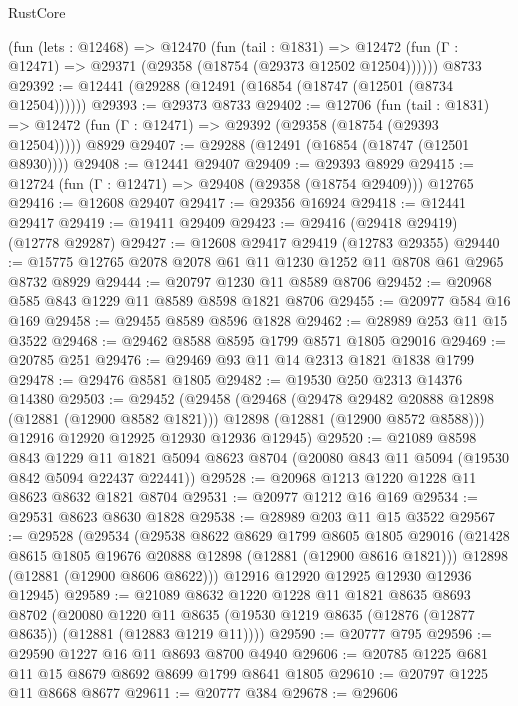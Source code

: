 \begin{lexlean}{RustCore}
\begin{coremodule}
    (fun (lets : @12468) =>
    @12470
      (fun (tail : @1831) =>
      @12472 (fun (Γ : @12471) => @29371 (@29358 (@18754 (@29373 @12502 @12504))))))
    @8733
@29392 := @12441 (@29288 (@12491 (@16854 (@18747 (@12501 (@8734 @12504))))))
@29393 := @29373 @8733
@29402 := @12706
    (fun (tail : @1831) => @12472 (fun (Γ : @12471) => @29392 (@29358 (@18754 (@29393 @12504)))))
    @8929
@29407 := @29288 (@12491 (@16854 (@18747 (@12501 @8930))))
@29408 := @12441 @29407
@29409 := @29393 @8929
@29415 := @12724 (fun (Γ : @12471) => @29408 (@29358 (@18754 @29409))) @12765
@29416 := @12608 @29407
@29417 := @29356 @16924
@29418 := @12441 @29417
@29419 := @19411 @29409
@29423 := @29416 (@29418 @29419) (@12778 @29287)
@29427 := @12608 @29417 @29419 (@12783 @29355)
@29440 := @15775 @12765 @2078 @2078 @61 @11 @1230 @1252 @11 @8708 @61 @2965 @8732 @8929
@29444 := @20797 @1230 @11 @8589 @8706
@29452 := @20968 @585 @843 @1229 @11 @8589 @8598 @1821 @8706
@29455 := @20977 @584 @16 @169
@29458 := @29455 @8589 @8596 @1828
@29462 := @28989 @253 @11 @15 @3522
@29468 := @29462 @8588 @8595 @1799 @8571 @1805 @29016
@29469 := @20785 @251
@29476 := @29469 @93 @11 @14 @2313 @1821 @1838 @1799
@29478 := @29476 @8581 @1805
@29482 := @19530 @250 @2313 @14376 @14380
@29503 := @29452
    (@29458
      (@29468
        (@29478 @29482 @20888 @12898 (@12881 (@12900 @8582 @1821)))
        @12898
        (@12881 (@12900 @8572 @8588)))
      @12916
      @12920
      @12925
      @12930
      @12936
      @12945)
@29520 := @21089
    @8598
    @843
    @1229
    @11
    @1821
    @5094
    @8623
    @8704
    (@20080 @843 @11 @5094 (@19530 @842 @5094 @22437 @22441))
@29528 := @20968 @1213 @1220 @1228 @11 @8623 @8632 @1821 @8704
@29531 := @20977 @1212 @16 @169
@29534 := @29531 @8623 @8630 @1828
@29538 := @28989 @203 @11 @15 @3522
@29567 := @29528
    (@29534
      (@29538
        @8622
        @8629
        @1799
        @8605
        @1805
        @29016
        (@21428 @8615 @1805 @19676 @20888 @12898 (@12881 (@12900 @8616 @1821)))
        @12898
        (@12881 (@12900 @8606 @8622)))
      @12916
      @12920
      @12925
      @12930
      @12936
      @12945)
@29589 := @21089
    @8632
    @1220
    @1228
    @11
    @1821
    @8635
    @8693
    @8702
    (@20080
      @1220
      @11
      @8635
      (@19530 @1219 @8635 (@12876 (@12877 @8635)) (@12881 (@12883 @1219 @11))))
@29590 := @20777 @795
@29596 := @29590 @1227 @16 @11 @8693 @8700 @4940
@29606 := @20785 @1225 @681 @11 @15 @8679 @8692 @8699 @1799 @8641 @1805
@29610 := @20797 @1225 @11 @8668 @8677
@29611 := @20777 @384
@29678 := @29606

\end{coremodule}
\end{lexlean}
